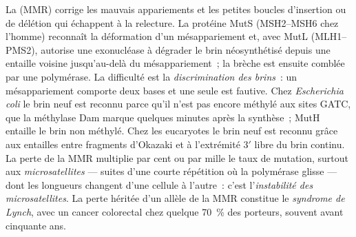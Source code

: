 \begin{definition}\label{def:b3:dna-repair:mmr}
La \emph{} (MMR) corrige les mauvais
appariements et les petites boucles d'insertion ou de délétion qui
échappent à la relecture. La protéine MutS (MSH2--MSH6 chez l'homme)
reconnaît la déformation d'un mésappariement et, avec MutL
(MLH1--PMS2), autorise une exonucléase à dégrader le brin néosynthétisé
depuis une entaille voisine jusqu'au-delà du mésappariement~; la brèche
est ensuite comblée par une polymérase. La difficulté est la
\emph{discrimination des brins}~: un mésappariement comporte deux bases
et une seule est fautive. Chez \emph{Escherichia coli} le brin neuf est
reconnu parce qu'il n'est pas encore méthylé aux sites GATC, que la
méthylase Dam marque quelques minutes après la synthèse~; MutH entaille
le brin non méthylé. Chez les eucaryotes le brin neuf est reconnu grâce
aux entailles entre fragments d'Okazaki et à l'extrémité 3$'$ libre du
brin continu. La perte de la MMR multiplie par cent ou par mille le
taux de mutation, surtout aux \emph{microsatellites} --- suites d'une
courte répétition où la polymérase glisse --- dont les longueurs
changent d'une cellule à l'autre~: c'est l'\emph{instabilité des
microsatellites}. La perte héritée d'un allèle de la MMR constitue le
\emph{syndrome de Lynch}, avec un cancer colorectal chez quelque
\qty{70}{\%} des porteurs, souvent avant cinquante ans.
\end{definition}

